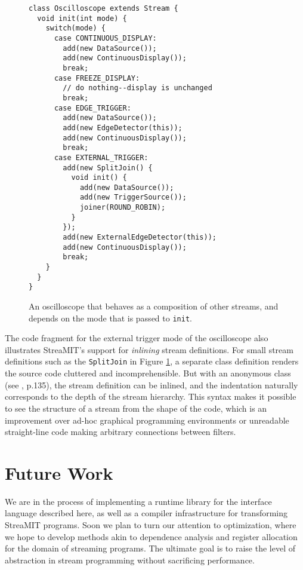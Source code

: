 \documentclass[10pt]{article}
\begin{document}
\begin{figure}[t]
\scriptsize
\begin{verbatim}
class Oscilloscope extends Stream {
  void init(int mode) {
    switch(mode) {
      case CONTINUOUS_DISPLAY:
        add(new DataSource());
        add(new ContinuousDisplay());
        break;
      case FREEZE_DISPLAY:
        // do nothing--display is unchanged
        break;
      case EDGE_TRIGGER:
        add(new DataSource());
        add(new EdgeDetector(this));
        add(new ContinuousDisplay());
        break;
      case EXTERNAL_TRIGGER:
        add(new SplitJoin() {
          void init() {
            add(new DataSource());
            add(new TriggerSource());
            joiner(ROUND_ROBIN);
          }
        });
        add(new ExternalEdgeDetector(this));
        add(new ContinuousDisplay());
        break;
    }  
  }
}
\end{verbatim}
\vspace{-12pt}
\caption{\protect\small An oscilloscope that behaves
as a composition of other streams, and depends on the mode that is
passed to {\tt init}.
\protect\label{fig2}}
\vspace{-12pt}
\end{figure}

The code fragment for the external trigger mode of the oscilloscope
also illustrates StreaMIT's support for {\it inlining} stream
definitions.  For small stream definitions such as the {\tt SplitJoin}
in Figure \ref{fig2}, a separate class definition renders the source
code cluttered and incomprehensible.  But with an anonymous class (see
, p.135), the stream definition can be inlined, and the
indentation naturally corresponds to the depth of the stream
hierarchy.  This syntax makes it possible to see the structure of a
stream from the shape of the code, which is an improvement over ad-hoc
graphical programming environments or unreadable straight-line code
making arbitrary connections between filters.

\section{Future Work}

We are in the process of implementing a runtime library for the
interface language described here, as well as a compiler
infrastructure for transforming StreaMIT programs.  Soon we plan to
turn our attention to optimization, where we hope to develop methods
akin to dependence analysis and register allocation for the domain of
streaming programs.  The ultimate goal is to raise the level of
abstraction in stream programming without sacrificing performance.



\end{document}
